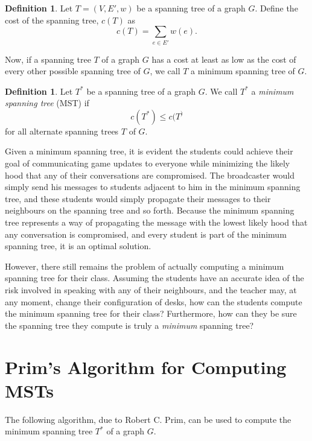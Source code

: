 \documentclass[a4paper,11pt]{report}
\theoremstyle{plain}
\theoremstyle{definition}
\newtheorem{defn}[thm]{Definition}
\begin{document}
\begin{defn}
Let $T = (V, E', w)$ be a spanning tree of a graph $G$. Define the cost of the
spanning tree, $c(T)$ as
\begin{equation*}
    c(T) = \sum_{e \in E'}{w(e)}.
\end{equation*}
\end{defn}

Now, if a spanning tree $T$ of a graph $G$ has a cost at least as low as the
cost of every other possible spanning tree of $G$, we call $T$ a minimum
spanning tree of $G$.

\begin{defn} Let $T^*$ be a spanning tree of a graph $G$. We call $T^*$ a
\emph{minimum spanning tree} (MST) if
\begin{equation*}
    c(T^*) \leq c(T^)
\end{equation*}
for all alternate spanning trees $T$ of $G$.
\end{defn}

Given a minimum spanning tree, it is evident the students could achieve their
goal of communicating game updates to everyone while minimizing the likely hood
that any of their conversations are compromised. The broadcaster would simply
send his messages to students adjacent to him in the minimum spanning tree,
and these students would simply propagate their messages to their
neighbours on the spanning tree and so forth. Because the minimum spanning
tree represents a way of propagating the message with the lowest likely
hood that any conversation is compromised, and every student is part of the
minimum spanning tree, it is an optimal solution.

However, there still remains the problem of actually computing a minimum
spanning tree for their class. Assuming the students have an accurate idea of
the risk involved in speaking with any of their neighbours, and the teacher may,
at any moment, change their configuration of desks, how can the students
compute the minimum spanning tree for their class? Furthermore, how can they
be sure the spanning tree they compute is truly a \emph{minimum} spanning tree?

\section{Prim's Algorithm for Computing MSTs}

The following algorithm, due to Robert C. Prim, can be used to compute
the minimum spanning tree $T^*$ of a graph $G$.
\end{document}
